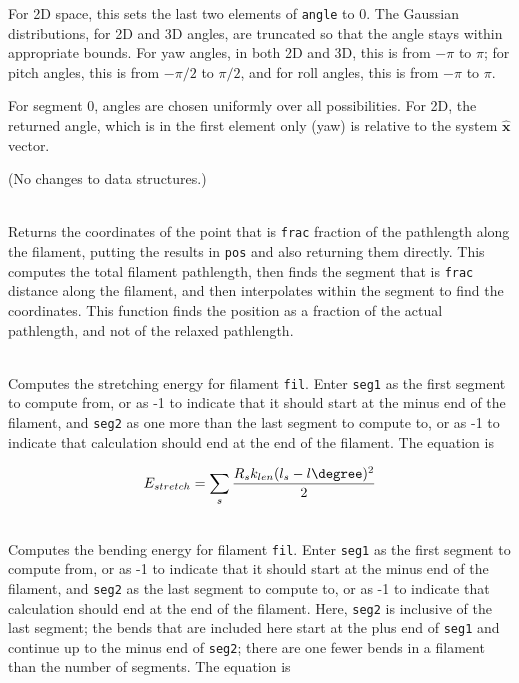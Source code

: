 \documentclass {scrbook}
\newcommand {\ttt} {\texttt}
\begin{document}
\begin{description}
For 2D space, this sets the last two elements of \ttt{angle} to 0. The Gaussian distributions, for 2D and 3D angles, are truncated so that the angle stays within appropriate bounds. For yaw angles, in both 2D and 3D, this is from $-\pi$ to $\pi$; for pitch angles, this is from $-\pi/2$ to $\pi/2$, and for roll angles, this is from $-\pi$ to $\pi$.

For segment 0, angles are chosen uniformly over all possibilities. For 2D, the returned angle, which is in the first element only (yaw) is relative to the system $\hat{\bm{x}}$ vector.

\item[\underline{Computations on filaments}]
(No changes to data structures.)

\item[\ttt{double *filGetPositionOnFil(const filamentptr fil,double frac,double *pos)}]
\hfill \\
Returns the coordinates of the point that is \ttt{frac} fraction of the pathlength along the filament, putting the results in \ttt{pos} and also returning them directly. This computes the total filament pathlength, then finds the segment that is \ttt{frac} distance along the filament, and then interpolates within the segment to find the coordinates. This function finds the position as a fraction of the actual pathlength, and not of the relaxed pathlength.

\item[\ttt{double filStretchEnergy(const filamentptr fil, int seg1, int seg2)}]
\hfill \\
Computes the stretching energy for filament \ttt{fil}. Enter \ttt{seg1} as the first segment to compute from, or as -1 to indicate that it should start at the minus end of the filament, and \ttt{seg2} as one more than the last segment to compute to, or as -1 to indicate that calculation should end at the end of the filament. The equation is

$$E_{stretch} = \sum_{s} \frac{R_s k_{len} (l_s - l\degree)^2}{2}$$

\item[\ttt{double filBendEnergy(const filamentptr fil, int seg1, int seg2)}]
\hfill \\
Computes the bending energy for filament \ttt{fil}. Enter \ttt{seg1} as the first segment to compute from, or as -1 to indicate that it should start at the minus end of the filament, and \ttt{seg2} as the last segment to compute to, or as -1 to indicate that calculation should end at the end of the filament. Here, \ttt{seg2} is inclusive of the last segment; the bends that are included here start at the plus end of \ttt{seg1} and continue up to the minus end of \ttt{seg2}; there are one fewer bends in a filament than the number of segments. The equation is


\end{description}
\end{document}
